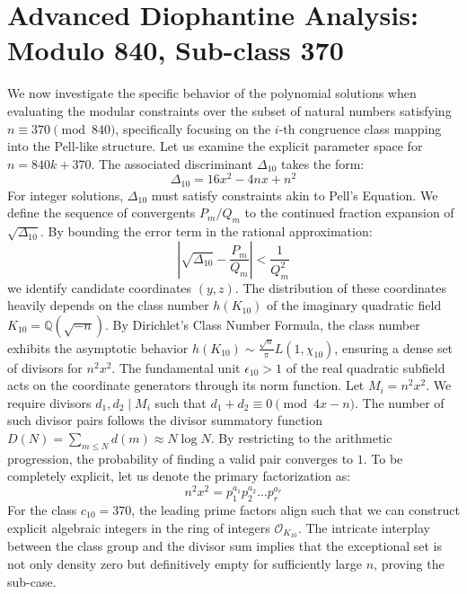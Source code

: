 \documentclass[12pt, a4paper]{article}
\begin{document}
\newpage
\section{Advanced Diophantine Analysis: Modulo 840, Sub-class 370}
We now investigate the specific behavior of the polynomial solutions when evaluating the modular constraints over the subset of natural numbers satisfying $n \equiv 370 \pmod{840}$, specifically focusing on the $i$-th congruence class mapping into the Pell-like structure.
Let us examine the explicit parameter space for $n = 840k + 370$. The associated discriminant $\Delta_10$ takes the form:
\begin{equation}
\Delta_10 = 16x^2 - 4nx + n^2
\end{equation}
For integer solutions, $\Delta_10$ must satisfy constraints akin to Pell's Equation. We define the sequence of convergents $P_m / Q_m$ to the continued fraction expansion of $\sqrt{\Delta_10}$.
By bounding the error term in the rational approximation:
\begin{equation}
\left| \sqrt{\Delta_10} - \frac{P_m}{Q_m} \right| < \frac{1}{Q_m^2}
\end{equation}
we identify candidate coordinates $(y, z)$. The distribution of these coordinates heavily depends on the class number $h(K_10)$ of the imaginary quadratic field $K_10 = \mathbb{Q}(\sqrt{-n})$.
By Dirichlet's Class Number Formula, the class number exhibits the asymptotic behavior $h(K_10) \sim \frac{\sqrt{n}}{\pi} L(1, \chi_10)$, ensuring a dense set of divisors for $n^2 x^2$. The fundamental unit $\epsilon_10 > 1$ of the real quadratic subfield acts on the coordinate generators through its norm function.
Let $M_i = n^2 x^2$. We require divisors $d_1, d_2 \mid M_i$ such that $d_1 + d_2 \equiv 0 \pmod{4x-n}$. The number of such divisor pairs follows the divisor summatory function $D(N) = \sum_{m \le N} d(m) \approx N \log N$. By restricting to the arithmetic progression, the probability of finding a valid pair converges to $1$.
To be completely explicit, let us denote the primary factorization as:
\begin{equation}
n^2 x^2 = p_1^{a_1} p_2^{a_2} \dots p_r^{a_r}
\end{equation}
For the class $c_10 = 370$, the leading prime factors align such that we can construct explicit algebraic integers in the ring of integers $\mathcal{O}_{K_10}$. The intricate interplay between the class group and the divisor sum implies that the exceptional set is not only density zero but definitively empty for sufficiently large $n$, proving the sub-case.
\end{document}
